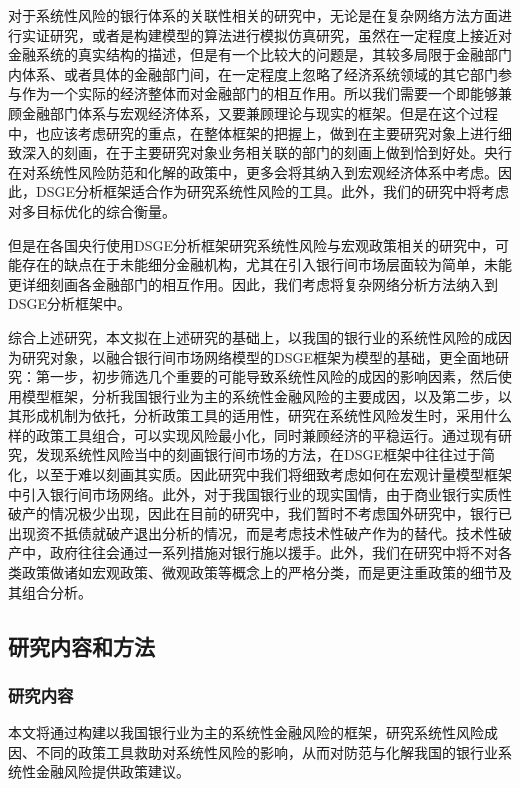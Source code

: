 对于系统性风险的银行体系的关联性相关的研究中，无论是在复杂网络方法方面进行实证研究，或者是构建模型的算法进行模拟仿真研究，虽然在一定程度上接近对金融系统的真实结构的描述，但是有一个比较大的问题是，其较多局限于金融部门内体系、或者具体的金融部门间，在一定程度上忽略了经济系统领域的其它部门参与作为一个实际的经济整体而对金融部门的相互作用。所以我们需要一个即能够兼顾金融部门体系与宏观经济体系，又要兼顾理论与现实的框架。但是在这个过程中，也应该考虑研究的重点，在整体框架的把握上，做到在主要研究对象上进行细致深入的刻画，在于主要研究对象业务相关联的部门的刻画上做到恰到好处。央行在对系统性风险防范和化解的政策中，更多会将其纳入到宏观经济体系中考虑。因此，DSGE分析框架适合作为研究系统性风险的工具。此外，我们的研究中将考虑对多目标优化的综合衡量。

但是在各国央行使用DSGE分析框架研究系统性风险与宏观政策相关的研究中，可能存在的缺点在于未能细分金融机构，尤其在引入银行间市场层面较为简单，未能更详细刻画各金融部门的相互作用。因此，我们考虑将复杂网络分析方法纳入到DSGE分析框架中。

综合上述研究，本文拟在上述研究的基础上，以我国的银行业的系统性风险的成因为研究对象，以融合银行间市场网络模型的DSGE框架为模型的基础，更全面地研究：第一步，初步筛选几个重要的可能导致系统性风险的成因的影响因素，然后使用模型框架，分析我国银行业为主的系统性金融风险的主要成因，以及第二步，以其形成机制为依托，分析政策工具的适用性，研究在系统性风险发生时，采用什么样的政策工具组合，可以实现风险最小化，同时兼顾经济的平稳运行。通过现有研究，发现系统性风险当中的刻画银行间市场的方法，在DSGE框架中往往过于简化，以至于难以刻画其实质。因此研究中我们将细致考虑如何在宏观计量模型框架中引入银行间市场网络。此外，对于我国银行业的现实国情，由于商业银行实质性破产的情况极少出现，因此在目前的研究中，我们暂时不考虑国外研究中，银行已出现资不抵债就破产退出分析的情况，而是考虑技术性破产作为的替代。技术性破产中，政府往往会通过一系列措施对银行施以援手。此外，我们在研究中将不对各类政策做诸如宏观政策、微观政策等概念上的严格分类，而是更注重政策的细节及其组合分析。


\newpage
\subsection{研究内容和方法}

\subsubsection{研究内容}
本文将通过构建以我国银行业为主的系统性金融风险的框架，研究系统性风险成因、不同的政策工具救助对系统性风险的影响，从而对防范与化解我国的银行业系统性金融风险提供政策建议。


